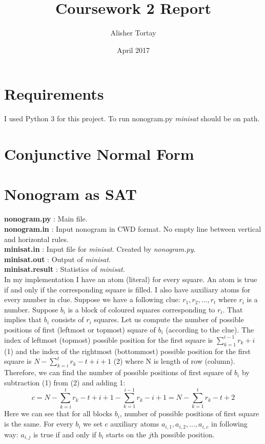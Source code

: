 \documentclass{article}
\title{Coursework 2 Report}
\author{Alisher Tortay}
\date{April 2017}
\begin{document}
\maketitle

\section{Requirements}
I used Python 3 for this project. To run nonogram.py \textit{minisat} should be on path.

\section{Conjunctive Normal Form}

\section{Nonogram as SAT}

\textbf{nonogram.py} : Main file.\\
\textbf{nonogram.in} : Input nonogram in CWD format. No empty line between vertical and horizontal rules.\\
\textbf{minisat.in} : Input file for \textit{minisat}. Created by \textit{nonogram.py}.\\
\textbf{minisat.out} : Output of \textit{minisat}.\\
\textbf{minisat.result} : Statistics of \textit{minisat}.\\

In my implementation I have an atom (literal) for every square. An atom is true if and only if the corresponding square is filled. I also have auxiliary atoms for every number in clue. Suppose we have a following clue: $r_1, r_2, ..., r_t$ where $r_i$ is a number. Suppose $b_i$ is a block of coloured squares corresponding to $r_i$. That implies that $b_i$ consists of $r_i$ squares. Let us compute the number of possible positions of first (leftmost or topmost) square of $b_i$ (according to the clue). The index of leftmost (topmost) possible position for the first square is $\sum_{k=1}^{i-1} r_k + i$ (1) and the index of the rightmost (bottommost) possible position for the first square is $N - \sum_{k=i}^{t} r_k - t + i + 1$ (2) where N is length of row (column). Therefore, we can find the number of possible positions of first square of $b_i$ by subtraction (1) from (2) and adding 1:
$$c = N - \sum_{k=i}^{t} r_k - t + i + 1 - \sum_{k=1}^{i-1} r_k - i + 1 = N - \sum_{k=1}^{t} r_k - t + 2$$
Here we can see that for all blocks $b_i$, number of possible positions of first square is the same. For every $b_i$ we set $c$ auxiliary atoms $a_{i,1}, a_{i,2}, ..., a_{i,c}$ in following way: $a_{i,j}$ is true if and only if $b_i$ starts on the $j$th possible position.
\end{document}
